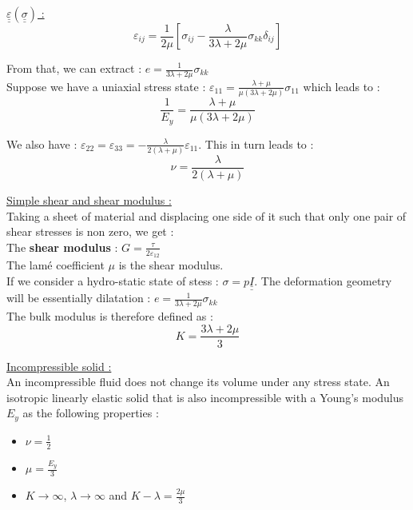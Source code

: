 \documentclass[../main.tex]{subfiles}
\begin{document}
\quad \underline{$\underline{\underline{\varepsilon}}(\underline{\underline{\sigma}})$ :}\\
\begin{equation}
    \varepsilon_{ij} = \frac{1}{2\mu} [\sigma_{ij} - \frac{\lambda}{3\lambda + 2\mu} \sigma_{kk} \delta_{ij}]
\end{equation}

From that, we can extract : $e = \frac{1}{3\lambda + 2\mu} \sigma_{kk}$\\

Suppose we have a uniaxial stress state : $\varepsilon_{11} = \frac{\lambda+\mu}{\mu(3\lambda+2\mu)}\sigma_{11}$ which leads to : \begin{equation}
    \frac{1}{E_y} = \frac{\lambda+\mu}{\mu(3\lambda + 2\mu)}
\end{equation}

We also have : $\varepsilon_{22} = \varepsilon_{33} = -\frac{\lambda}{2(\lambda+\mu)} \varepsilon_{11}$. This in turn leads to :\\
\begin{equation}
    \nu = \frac{\lambda}{2(\lambda+\mu)}
\end{equation}

\quad \underline{Simple shear and shear modulus :}\\
Taking a sheet of material and displacing one side of it such that only one pair of shear stresses is non zero, we get :\\
The \textbf{shear modulus} : $G = \frac{\tau}{2 \varepsilon_{12}}$\\

The lamé coefficient $\mu$ is the shear modulus. \\

If we consider a hydro-static state of stess : $\sigma = p \underline{\underline{I}}$. The deformation geometry will be essentially dilatation : $e = \frac{1}{3\lambda + 2\mu} \sigma_{kk}$\\
The bulk modulus is therefore defined as : \begin{equation}
    K = \frac{3\lambda+2\mu}{3}
\end{equation}

\quad \underline{Incompressible solid :}\\
An incompressible fluid does not change its volume under any stress state. An isotropic linearly elastic solid that is also incompressible with a Young's modulus $E_y$ as the following properties :\begin{itemize}
    \item $\nu = \frac{1}{2}$\\
    \item $\mu = \frac{E_y}{3}$\\
    \item $K\rightarrow \infty$, $\lambda \rightarrow \infty$ and $K-\lambda = \frac{2\mu}{3}$\\
\end{itemize}
\end{document}
